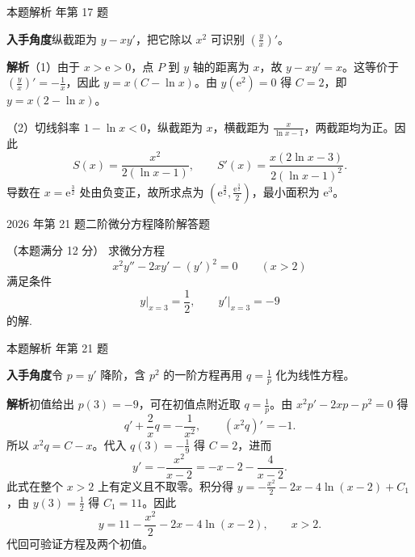 \documentclass[UTF8,zihao=-4,fontset=fandol]{ctexart}
\newcommand{\QuestionPage}[6]{%
  \par\noindent\begin{minipage}{\linewidth}
  \raggedright
  {\small\textcolor{black!60}{#3\quad #5}\hfill\textcolor{accent}{#2}}\par\smallskip}
\newcommand{\QuestionEnd}{\end{minipage}\par\medskip}
\newcommand{\QuestionPage}[6]{%
  \clearpage
  {\small\textcolor{accent}{#1\hfill #2}}\par\medskip
  {\small\textcolor{black!60}{#3\quad #5\hfill #6}}\par\vspace{9bp}}
\newcommand{\QuestionEnd}{}
\newenvironment{QuestionSolution}[1]{%
  \clearpage
  {\small\textcolor{black!60}{本题解析\quad #1}}\par\medskip
}{\par\clearpage}
\begin{document}
\begin{QuestionSolution}{2023 年第 17 题}
\textbf{入手角度}\quad 纵截距为 \(y-xy'\)，把它除以 \(x^2\) 可识别 \((\frac{y}{x})'\)。

\textbf{解析}\quad （1）由于 \(x>\mathrm{e}>0\)，点 \(P\) 到 \(y\) 轴的距离为 \(x\)，故 \(y-xy'=x\)。这等价于 \((\frac{y}{x})'=-\frac{1}{x}\)，因此 \(y=x(C-\ln x)\)。由 \(y(\mathrm{e}^2)=0\) 得 \(C=2\)，即 \(\boxed{y=x(2-\ln x)}\)。

（2）切线斜率 \(1-\ln x<0\)，纵截距为 \(x\)，横截距为 \(\frac{x}{\ln x-1}\)，两截距均为正。因此
\[
S(x)=\frac{x^2}{2(\ln x-1)},\qquad
S'(x)=\frac{x(2\ln x-3)}{2(\ln x-1)^2}.
\]
导数在 \(x=\mathrm{e}^{\frac{3}{2}}\) 处由负变正，故所求点为
\(\boxed{(\mathrm{e}^{\frac{3}{2}},\frac{\mathrm{e}^{\frac{3}{2}}}{2})}\)，最小面积为 \(\boxed{\mathrm{e}^3}\)。
\end{QuestionSolution}

\QuestionPage{4.1 几类简单的微分方程}{解答题}{2026 年第 21 题}{2}{二阶微分方程降阶}{218 / 234}
（本题满分 12 分）
求微分方程
\[x^2y''-2xy'-(y')^2=0\qquad (x>2)
\]
满足条件
\[y\big|_{x=3}=\frac12,\qquad y'\big|_{x=3}=-9
\]
的解.
\QuestionEnd

\begin{QuestionSolution}{2026 年第 21 题}
\textbf{入手角度}\quad 令 \(p=y'\) 降阶，含 \(p^2\) 的一阶方程再用 \(q=\frac{1}{p}\) 化为线性方程。

\textbf{解析}\quad 初值给出 \(p(3)=-9\)，可在初值点附近取 \(q=\frac{1}{p}\)。由 \(x^2p'-2xp-p^2=0\) 得
\[
q'+\frac2xq=-\frac1{x^2},\qquad
(x^2q)'=-1.
\]
所以 \(x^2q=C-x\)。代入 \(q(3)=-\frac{1}{9}\) 得 \(C=2\)，进而
\[
y'=-\frac{x^2}{x-2}=-x-2-\frac4{x-2}.
\]
此式在整个 \(x>2\) 上有定义且不取零。积分得 \(y=-\frac{x^2}{2}-2x-4\ln(x-2)+C_1\)，由 \(y(3)=\frac{1}{2}\) 得 \(C_1=11\)。因此
\[
\boxed{y=11-\frac{x^2}{2}-2x-4\ln(x-2)},\qquad x>2 .
\]
代回可验证方程及两个初值。
\end{QuestionSolution}
\end{document}
